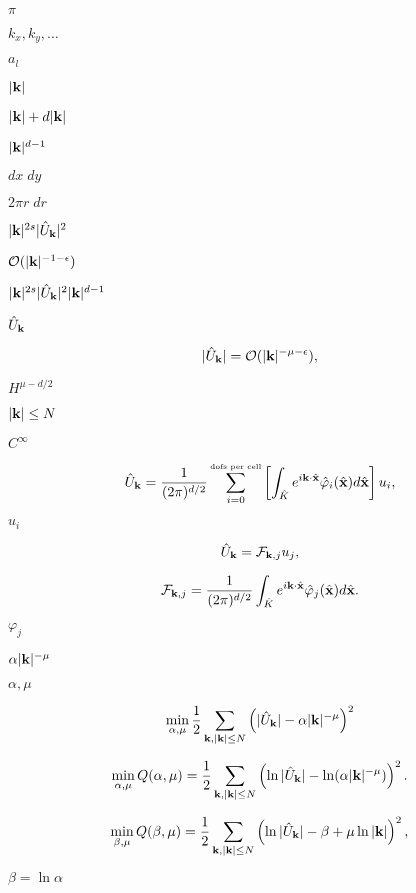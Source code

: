 \documentclass{article}
\begin{document}
$\pi$
\pagebreak

$k_x, k_y, \ldots$
\pagebreak

$a_l$
\pagebreak

$|{\bf k}|$
\pagebreak

$|{\bf k}|+d|{\bf k}|$
\pagebreak

$|{\bf k}|^{d-1}$
\pagebreak

$dx\;dy$
\pagebreak

$2\pi r\; dr$
\pagebreak

$|{\bf k}|^{2s}|\hat U_{\bf k}|^2$
\pagebreak

${\cal O}(|{\bf k}|^{-1-\epsilon})$
\pagebreak

$|{\bf k}|^{2s}|\hat U_{\bf k}|^2 |{\bf k}|^{d-1}$
\pagebreak

$\hat U_{\bf k}$
\pagebreak

\[ |\hat U_{\bf k}| = {\cal O}(|{\bf k}|^{-\mu-\epsilon}), \]
\pagebreak

$H^{\mu-d/2}$
\pagebreak

$|{\bf k}|\le N$
\pagebreak

$C^\infty$
\pagebreak

\[ \hat U_{\bf k} = \frac 1{(2\pi)^{d/2}} \sum_{i=0}^{\textrm{\tiny dofs per cell}} \left[\int_{\hat K} e^{i {\bf k}\cdot \hat{\bf x}} \hat \varphi_i(\hat{\bf x}) d\hat{\bf x} \right] u_i, \]
\pagebreak

$u_i$
\pagebreak

\[ \hat U_{\bf k} = {\cal F}_{{\bf k},j} u_j, \]
\pagebreak

\[ {\cal F}_{{\bf k},j} = \frac 1{(2\pi)^{d/2}} \int_{\hat K} e^{i {\bf k}\cdot \hat{\bf x}} \hat \varphi_j(\hat{\bf x}) d\hat{\bf x}. \]
\pagebreak

$\varphi_j$
\pagebreak

$\alpha |{\bf k}|^{-\mu}$
\pagebreak

$\alpha,\mu$
\pagebreak

\[ \min_{\alpha,\mu} \frac 12 \sum_{{\bf k}, |{\bf k}|\le N} \left( |\hat U_{\bf k}| - \alpha |{\bf k}|^{-\mu}\right)^2 \]
\pagebreak

\[ \min_{\alpha,\mu} Q(\alpha,\mu) = \frac 12 \sum_{{\bf k}, |{\bf k}|\le N} \left( \ln |\hat U_{\bf k}| - \ln (\alpha |{\bf k}|^{-\mu})\right)^2. \]
\pagebreak

\[ \min_{\beta,\mu} Q(\beta,\mu) = \frac 12 \sum_{{\bf k}, |{\bf k}|\le N} \left( \ln |\hat U_{\bf k}| - \beta + \mu \ln |{\bf k}|\right)^2, \]
\pagebreak

$\beta=\ln \alpha$
\pagebreak
\end{document}
